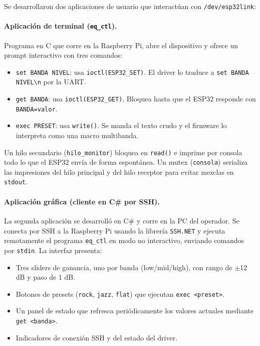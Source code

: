 \documentclass[RT]{UTNLSE}
\begin{document}
Se desarrollaron dos aplicaciones de usuario que interactúan con \texttt{/dev/esp32link}:

\paragraph{Aplicación de terminal (\texttt{eq\_ctl}).} Programa en C que corre en la Raspberry Pi, abre el dispositivo y ofrece un prompt interactivo con tres comandos:

\begin{itemize}
    \item \texttt{set BANDA NIVEL}: usa \texttt{ioctl(ESP32\_SET)}. El driver lo traduce a \texttt{set BANDA NIVEL\textbackslash n} por la UART.
    \item \texttt{get BANDA}: usa \texttt{ioctl(ESP32\_GET)}. Bloquea hasta que el ESP32 responde con \texttt{BANDA=valor}.
    \item \texttt{exec PRESET}: usa \texttt{write()}. Se manda el texto crudo y el firmware lo interpreta como una macro multibanda.
\end{itemize}

Un hilo secundario (\texttt{hilo\_monitor}) bloquea en \texttt{read()} e imprime por consola todo lo que el ESP32 envía de forma espontánea. Un mutex (\texttt{consola}) serializa las impresiones del hilo principal y del hilo receptor para evitar mezclas en \texttt{stdout}.

\paragraph{Aplicación gráfica (cliente en C\# por SSH).} La segunda aplicación se desarrolló en C\# y corre en la PC del operador. Se conecta por SSH a la Raspberry Pi usando la librería \texttt{SSH.NET} y ejecuta remotamente el programa \texttt{eq\_ctl} en modo no interactivo, enviando comandos por \texttt{stdin}. La interfaz presenta:

\begin{itemize}
    \item Tres sliders de ganancia, uno por banda (low/mid/high), con rango de $\pm$12 dB y paso de 1 dB.
    \item Botones de presets (\texttt{rock}, \texttt{jazz}, \texttt{flat}) que ejecutan \texttt{exec <preset>}.
    \item Un panel de estado que refresca periódicamente los valores actuales mediante \texttt{get <banda>}.
    \item Indicadores de conexión SSH y del estado del driver.
\end{itemize}
\end{document}

